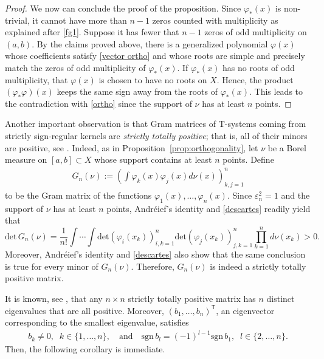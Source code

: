 \documentclass[twoside,a4paper]{amsart}
\newcommand{\sgn}{\mathrm{sgn}}
\renewcommand{\det}{\mathrm{det}}
\theoremstyle{remark}
\begin{document}
\begin{proof}
We now can conclude the proof of the proposition.  Since \( \varphi_*(x) \) is non-trivial, it cannot have more than $n-1$ zeros counted with multiplicity as explained after \eqref{fg1}. Suppose it has fewer that $n-1$ zeros of odd multiplicity on $(a,b)$. By the claims proved above, there is a generalized polynomial $\varphi(x)$ whose coefficients satisfy \eqref{vector ortho} and whose roots are  simple and precisely match the zeros of odd multiplicity of $\varphi_*(x)$. If $\varphi_*(x)$ has no roots of odd multiplicity, that $\varphi(x)$ is chosen to have no roots on $X$. Hence, the product $(\varphi_\ast\varphi)(x)$ keeps the same sign away from the roots of $\varphi_*(x)$. This leads to the contradiction with \eqref{ortho} since  the support of \( \nu \) has at least \( n \) points. 
\end{proof}

Another important observation is that Gram matrices of T-systems coming from strictly sign-regular kernels are \emph{strictly totally positive}; that is, all of their minors are positive, see \cite[Definition~III.2.3]{Pinkus}. Indeed, as in Proposition~\ref{prop:orthogonality}, let \( \nu \) be a Borel measure on \( [a,b] \subset X \) whose support contains at least \( n \) points. Define
\begin{align}
\label{Gram}
G_n(\nu) := \left(\int\varphi_k(x)\varphi_j(x)d\nu(x)\right)_{k,j=1}^n
\end{align}
to be the Gram matrix of the functions \( \varphi_1(x),\ldots,\varphi_n(x)\). Since \( \varepsilon_n^2=1 \) and the support of \( \nu \) has at least \( n \) points, Andr\'eief's identity and \eqref{descartes} readily yield that
\[
\det \, G_n(\nu) = \frac1{n!} \int \cdots \int \det\left(\varphi_i(x_k)\right)_{i,k=1}^n \det\left(\varphi_j(x_k)\right)_{j,k=1}^n \prod_{k=1}^n d\nu(x_k)>0.
\]
Moreover, Andr\'eief's identity and \eqref{descartes} also show that the same conclusion is true for every minor of \( G_n(\nu) \). Therefore, \( G_n(\nu) \) is indeed a strictly totally positive matrix.

It is known, see \cite[Theorem~III.2.8]{Pinkus}, that any \( n\times n\) strictly totally positive matrix has $n$ distinct eigenvalues that are all positive.  Moreover, \( (b_1,\ldots,b_n)^\mathsf{T} \), an eigenvector  corresponding to the smallest eigenvalue,  satisfies
\begin{align}
\label{sign bk}
b_k\neq 0, \;\; k\in\{1,\ldots,n\}, \quad \text{and} \quad \sgn\, b_l = (-1)^{l-1} \sgn \, b_1, \;\; l\in\{2,\ldots,n\}.    
\end{align}
Then, the following corollary is immediate.
\end{document}
